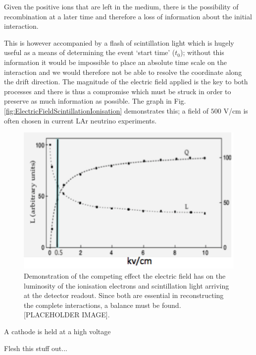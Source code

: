 Given the positive ions that are left in the medium, there is the possibility of recombination at a later time and therefore a loss of information about the initial interaction.


This is however accompanied by a flash of scintillation light which is hugely useful as a means of determining the event `start time' ($t_0$); without this information it would be impossible to place an absolute time scale on the interaction and we would therefore not be able to resolve the coordinate along the drift direction.  The magnitude of the electric field applied is the key to both processes and there is thus a compromise which must be struck in order to preserve as much information as possible.  The graph in Fig. \ref{fig:ElectricFieldScintillationIonisation} demonstrates this; a field of $500$ V/cm is often chosen in current LAr neutrino experiments.

\begin{figure}[ht]
  \centering
  \includegraphics[width=12cm]{ElectricFieldScintillationIonisation.png}
  \caption{Demonstration of the competing effect the electric field has on the luminosity of the ionisation electrons and scintillation light arriving at the detector readout.  Since both are essential in reconstructing the complete interactions, a balance must be found. [PLACEHOLDER IMAGE].}
  \label{fig:ElectronFieldScintiallationIonisation}
\end{figure}

A cathode is held at a high voltage



Flesh this stuff out...


